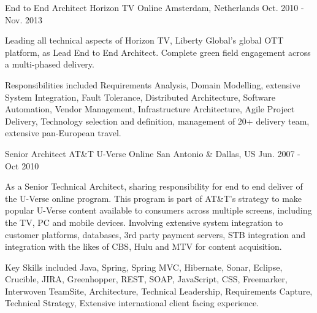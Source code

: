


\begin{cventries}


\cventry
{End to End Architect} %
{Horizon TV Online} %
{Amsterdam, Netherlands} %
{Oct. 2010 - Nov. 2013} %
{ %
\begin{cvitems}
\item {Leading all technical aspects of Horizon TV, Liberty Global's global OTT platform, as Lead End to End Architect. Complete green field engagement across a multi-phased delivery.}
\item {Responsibilities included Requirements Analysis, Domain Modelling, extensive System Integration, Fault Tolerance, Distributed Architecture, Software Automation, Vendor Management, Infrastructure Architecture, Agile Project Delivery, Technology selection and definition, management of 20+ delivery team, extensive pan-European travel.}
\end{cvitems}
}


\cventry
{Senior Architect} %
{AT\&T U-Verse Online} %
{San Antonio \& Dallas, US} %
{Jun. 2007 - Oct 2010} %
{ %
\begin{cvitems}
\item {As a Senior Technical Architect, sharing responsibility for end to end deliver of the U-Verse online program. This program is part of AT\&T’s strategy to make popular U-Verse content available to consumers across multiple screens, including the TV, PC and mobile devices. Involving extensive system integration to customer platforms, databases, 3rd party payment servers, STB integration and integration with the likes of CBS, Hulu and MTV for content acquisition.}
\item {Key Skills included Java, Spring, Spring MVC, Hibernate, Sonar, Eclipse, Crucible, JIRA, Greenhopper, REST, SOAP, JavaScript, CSS, Freemarker, Interwoven TeamSite, Architecture, Technical Leadership, Requirements Capture, Technical Strategy, Extensive international client facing experience.}
\end{cvitems}
}


\end{cventries}
